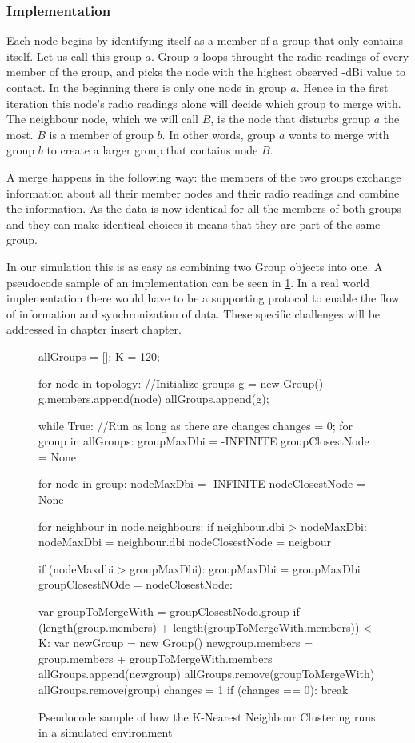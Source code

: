 \subsubsection{Implementation}
Each node begins by identifying itself as a member of a group that only contains itself.  Let us call this group $a$.
Group $a$ loops throught the radio readings of every member of the group, and picks the node with the highest observed -dBi value
to contact. In the beginning there is only one node in group $a$. Hence in the first iteration this node's radio readings alone will decide which group to merge with. 
The neighbour node, which we will call $B$, is the node that disturbs group $a$ the most. $B$ is a member of group $b$.
In other words, group $a$ wants to merge with group $b$ to create a larger group that contains node $B$.

A merge happens in the following way: the members of the two groups exchange information about all their member nodes and their radio readings and combine the information.
As the data is now identical for all the members of both groups and they can make identical choices it means that they are part of the same group. 

In our simulation this is as easy as combining two Group objects into one. A pseudocode sample of an implementation can be seen in \ref{fig:groupmerge}.
In a real world implementation there would have to be a supporting protocol to 
enable the flow of information and synchronization of data. These specific challenges will be addressed in chapter {{insert chapter}}.

	\begin{figure}[H]
		\tiny
		\begin{python}
allGroups = [];
K = 120;

for node in topology: //Initialize groups
	g = new Group()
	g.members.append(node)
	allGroups.append(g);

while True: //Run as long as there are changes
	changes = 0;	
	for group in allGroups: 
		groupMaxDbi = -INFINITE
		groupClosestNode = None

		for node in group:
			nodeMaxDbi = -INFINITE
			nodeClosestNode = None

			for neighbour in node.neighbours:
				if neighbour.dbi > nodeMaxDbi:
					nodeMaxDbi = neighbour.dbi
					nodeClosestNode = neigbour

			if (nodeMaxdbi > groupMaxDbi):
				groupMaxDbi = groupMaxDbi
				groupClosestNOde = nodeClosestNode:

		var groupToMergeWith = groupClosestNode.group
		if (length(group.members) + length(groupToMergeWith.members)) < K:
			var newGroup = new Group()
			newgroup.members = group.members + groupToMergeWith.members
			allGroups.append(newgroup)
			allGroups.remove(groupToMergeWith)
			allGroups.remove(group)
			changes = 1
	if (changes == 0):
		break
		\end{python}
			\caption{Pseudocode sample of how the K-Nearest Neighbour Clustering runs in a simulated environment}
			\label{fig:groupmerge}
	\end{figure}



